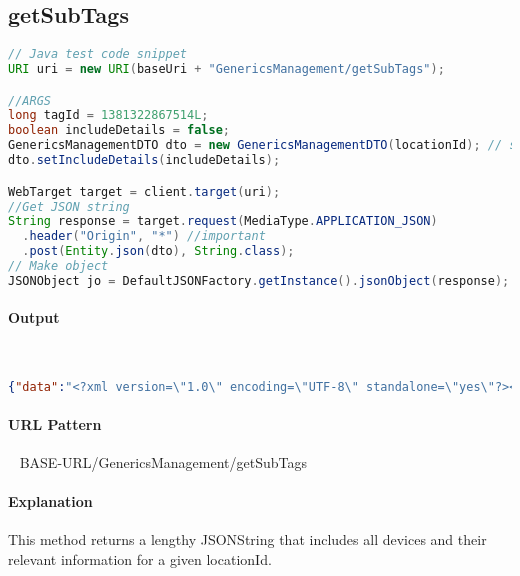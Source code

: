 \documentclass[
10pt, %
letterpaper, %
oneside, %
headinclude,footinclude, %
BCOR5mm, %
]{scrartcl}
\begin{document}

\subsection{\textbf{getSubTags}}

\begin{lstlisting}[language=Java]
// Java test code snippet
URI uri = new URI(baseUri + "GenericsManagement/getSubTags");

//ARGS
long tagId = 1381322867514L; 
boolean includeDetails = false;
GenericsManagementDTO dto = new GenericsManagementDTO(locationId); // searching for location 202
dto.setIncludeDetails(includeDetails);

WebTarget target = client.target(uri);
//Get JSON string
String response = target.request(MediaType.APPLICATION_JSON)
  .header("Origin", "*") //important
  .post(Entity.json(dto), String.class);
// Make object
JSONObject jo = DefaultJSONFactory.getInstance().jsonObject(response);
\end{lstlisting}

\paragraph{Output}~
\begin{lstlisting}[language=json]
{"data":"<?xml version=\"1.0\" encoding=\"UTF-8\" standalone=\"yes\"?><deviceTag id=\"1381322867351\" displayId=\"1381322867514\" name=\"device_tags\" locationId=\"24\"><deviceTag id=\"1381322867355\" name=\"Electrical\" locationId=\"24\"><deviceTag id=\"1381322867356\" name=\"Panel A\" locationId=\"24\"><deviceTag id=\"1381322867358\" name=\"10 Furnace\" locationId=\"24\"/><deviceTag id=\"1381322867359\" name=\"11 Lights - Server Room, Store Room\" locationId=\"24\"/>.....}
\end{lstlisting}

\paragraph{URL Pattern} 
~\newline
BASE-URL/GenericsManagement/getSubTags

\paragraph{Explanation} This method returns a lengthy JSONString that includes all devices and their relevant information for a given locationId.
\end{document}
